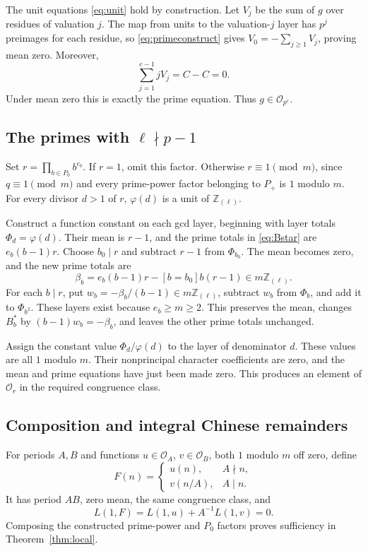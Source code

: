 \documentclass[11pt]{article}
\newcommand{\Rl}{\mathbb Z_{(\ell)}}
\newcommand{\OO}{\mathcal O}
\begin{document}
The unit equations \eqref{eq:unit} hold by construction. Let $V_j$ be the sum of $g$ over residues of valuation $j$. The map from units to the valuation-$j$ layer has $p^j$ preimages for each residue, so \eqref{eq:primeconstruct} gives $V_0=-\sum_{j\ge1}V_j$, proving mean zero. Moreover,
\[
 \sum_{j=1}^{e-1}jV_j=C-C=0.
\]
Under mean zero this is exactly the prime equation. Thus $g\in\OO_{p^e}$.

\subsection{The primes with $\ell\nmid p-1$}
Set $r=\prod_{b\in P_0}b^{e_b}$. If $r=1$, omit this factor. Otherwise $r\equiv1\pmod m$, since $q\equiv1\pmod m$ and every prime-power factor belonging to $P_+$ is $1$ modulo $m$. For every divisor $d>1$ of $r$, $\varphi(d)$ is a unit of $\Rl$.

Construct a function constant on each gcd layer, beginning with layer totals $\Phi_d=\varphi(d)$. Their mean is $r-1$, and the prime totals in \eqref{eq:Bstar} are $e_b(b-1)r$. Choose $b_0\mid r$ and subtract $r-1$ from $\Phi_{b_0}$. The mean becomes zero, and the new prime totals are
\[
 \beta_b=e_b(b-1)r-[b=b_0]b(r-1)\in m\Rl.
\]
For each $b\mid r$, put $w_b=-\beta_b/(b-1)\in m\Rl$, subtract $w_b$ from $\Phi_b$, and add it to $\Phi_{b^2}$. These layers exist because $e_b\ge m\ge2$. This preserves the mean, changes $B_b^*$ by $(b-1)w_b=-\beta_b$, and leaves the other prime totals unchanged.

Assign the constant value $\Phi_d/\varphi(d)$ to the layer of denominator $d$. These values are all $1$ modulo $m$. Their nonprincipal character coefficients are zero, and the mean and prime equations have just been made zero. This produces an element of $\OO_r$ in the required congruence class.

\subsection{Composition and integral Chinese remainders}
For periods $A,B$ and functions $u\in\OO_A$, $v\in\OO_B$, both $1$ modulo $m$ off zero, define
\[
 F(n)=\begin{cases}u(n),&A\nmid n,\\v(n/A),&A\mid n.\end{cases}
\]
It has period $AB$, zero mean, the same congruence class, and
\[
 L(1,F)=L(1,u)+A^{-1}L(1,v)=0.
\]
Composing the constructed prime-power and $P_0$ factors proves sufficiency in Theorem~\ref{thm:local}.
\end{document}

